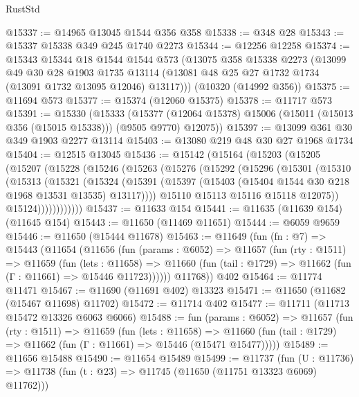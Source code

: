 \begin{lexlean}{RustStd}
\begin{coremodule}
@15337 := @14965 @13045 @1544 @356 @358
@15338 := @348 @28
@15343 := @15337 @15338 @349 @245 @1740 @2273
@15344 := @12256 @12258
@15374 := @15343
    @15344
    @18
    @1544
    @1544
    @573
    (@13075
      @358
      @15338
      @2273
      (@13099
        @49
        @30
        @28
        @1903
        @1735
        @13114
        (@13081 @48 @25 @27 @1732 @1734 (@13091 @1732 @13095 @12046) @13117)))
    (@10320 (@14992 @356))
@15375 := @11694 @573
@15377 := @15374 (@12060 @15375)
@15378 := @11717 @573
@15391 := @15330
    (@15333
      (@15377 (@12064 @15378) @15006 (@15011 (@15013 @356 (@15015 @15338))) (@9505 @9770) @12075))
@15397 := @13099 @361 @30 @349 @1903 @2277 @13114
@15403 := @13080 @219 @48 @30 @27 @1968 @1734
@15404 := @12515 @13045
@15436 := @15142
    (@15164
      (@15203
        (@15205
          (@15207
            (@15228
              (@15246
                (@15263
                  (@15276
                    (@15292
                      (@15296
                        (@15301
                          (@15310
                            (@15313
                              (@15321
                                (@15324
                                  (@15391
                                    (@15397
                                      (@15403 (@15404 @1544 @30 @218 @1968 @13531 @13535) @13117))))
                                @15110
                                @15113
                                @15116
                                @15118
                                @12075))
                            @15124))))))))))))
@15437 := @11633 @154
@15441 := @11635 (@11639 @154) (@11645 @154)
@15443 := @11650 (@11469 @11651)
@15444 := @6059 @9659
@15446 := @11650 (@15444 @11678)
@15463 := @11649
    (fun (fn : @7) =>
    @15443
      (@11654
        (@11656
          (fun (params : @6052) =>
          @11657
            (fun (rty : @1511) =>
            @11659
              (fun (lets : @11658) =>
              @11660 (fun (tail : @1729) => @11662 (fun (Γ : @11661) => @15446 @11723))))))
        @11768))
    @402
@15464 := @11774 @11471
@15467 := @11690 (@11691 @402) @13323
@15471 := @11650 (@11682 (@15467 @11698) @11702)
@15472 := @11714 @402
@15477 := @11711 (@11713 @15472 @13326 @6063 @6066)
@15488 := fun (params : @6052) =>
  @11657
    (fun (rty : @1511) =>
    @11659
      (fun (lets : @11658) =>
      @11660 (fun (tail : @1729) => @11662 (fun (Γ : @11661) => @15446 (@15471 @15477)))))
@15489 := @11656 @15488
@15490 := @11654 @15489
@15499 := @11737
    (fun (U : @11736) => @11738 (fun (t : @23) => @11745 (@11650 (@11751 @13323 @6069) @11762)))

\end{coremodule}
\end{lexlean}
